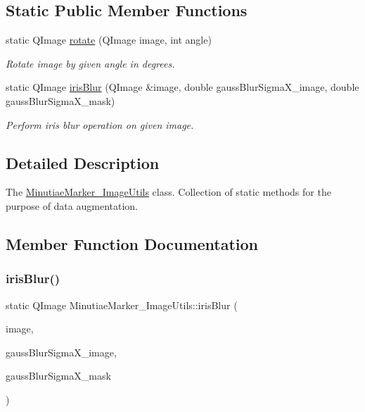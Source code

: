\subsection*{Static Public Member Functions}
\begin{DoxyCompactItemize}
\item 
static Q\+Image \mbox{\hyperlink{class_minutiae_marker___image_utils_a32423c55fb0867b8f212c059a232ffeb}{rotate}} (Q\+Image image, int angle)
\begin{DoxyCompactList}\small\item\em Rotate image by given angle in degrees. \end{DoxyCompactList}\item 
static Q\+Image \mbox{\hyperlink{class_minutiae_marker___image_utils_aab92c86a608501f23ae59762df470d60}{iris\+Blur}} (Q\+Image \&image, double gauss\+Blur\+Sigma\+X\+\_\+image, double gauss\+Blur\+Sigma\+X\+\_\+mask)
\begin{DoxyCompactList}\small\item\em Perform iris blur operation on given image. \end{DoxyCompactList}\end{DoxyCompactItemize}


\subsection{Detailed Description}
The \mbox{\hyperlink{class_minutiae_marker___image_utils}{Minutiae\+Marker\+\_\+\+Image\+Utils}} class. Collection of static methods for the purpose of data augmentation. 

\subsection{Member Function Documentation}
\mbox{\label{class_minutiae_marker___image_utils_aab92c86a608501f23ae59762df470d60}} 
\subsubsection{\texorpdfstring{iris\+Blur()}{irisBlur()}}
{\footnotesize\ttfamily static Q\+Image Minutiae\+Marker\+\_\+\+Image\+Utils\+::iris\+Blur (\begin{DoxyParamCaption}\item[{Q\+Image \&}]{image,  }\item[{double}]{gauss\+Blur\+Sigma\+X\+\_\+image,  }\item[{double}]{gauss\+Blur\+Sigma\+X\+\_\+mask }\end{DoxyParamCaption})\hspace{0.3cm}{\ttfamily [static]}}



